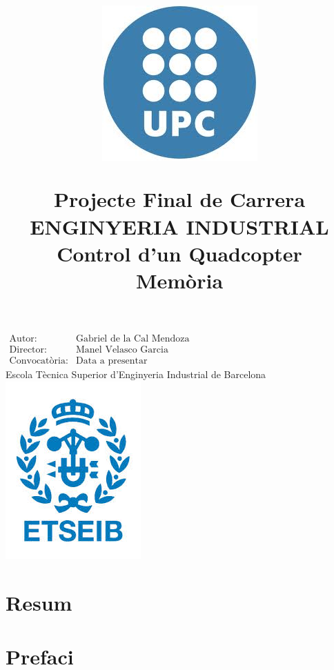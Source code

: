 \documentclass[twoside]{article}
\title{\begin{center} 
\includegraphics[scale=0.3]{images/upc.jpg} 
\end{center} 
\vspace{1cm} 
Projecte Final de Carrera\\
ENGINYERIA INDUSTRIAL \\
\vspace{1.5cm} 
\Huge{Control d'un Quadcopter} 
\vspace{2cm} \\ 
Memòria}
\date{}
\begin{document}
\maketitle
\begin{center}
\large{
$\begin{array}{ll}
\mbox{Autor:} & \mbox{Gabriel de la Cal Mendoza} \\
\mbox{Director:} & \mbox{Manel Velasco Garcia} \\
\mbox{Convocatòria:} & \mbox{Data a presentar}
\end{array}$}
\\ \vspace{2cm} \Large{Escola Tècnica Superior d'Enginyeria Industrial de Barcelona}\\ \vspace{1cm}
\includegraphics[scale=0.4]{images/etseib.jpg}
\end{center}

\thispagestyle{empty}
\newpage
\begin{center}

\end{center}
\thispagestyle{empty}
\newpage
\setcounter{page}{1}
\section*{Resum}
\newpage
\begin{center}

\end{center}
\thispagestyle{empty}
\newpage

\setcounter{page}{1}
\tableofcontents
{}
\fancyfoot[C]{}
\newpage
\fancyhead[LE,RO]{\thepage}
\setcounter{page}{4}
\listoffigures
\newpage

\section{Prefaci} 
\end{document}
